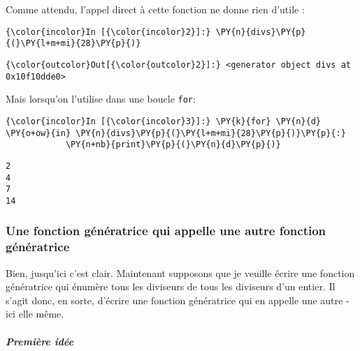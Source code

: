     Comme attendu, l'appel direct à cette fonction ne donne rien d'utile :

    \begin{Verbatim}[commandchars=\\\{\},frame=single,framerule=0.3mm,rulecolor=\color{cellframecolor}]
{\color{incolor}In [{\color{incolor}2}]:} \PY{n}{divs}\PY{p}{(}\PY{l+m+mi}{28}\PY{p}{)}
\end{Verbatim}


\begin{Verbatim}[commandchars=\\\{\},frame=single,framerule=0.3mm,rulecolor=\color{cellframecolor}]
{\color{outcolor}Out[{\color{outcolor}2}]:} <generator object divs at 0x10f10dde0>
\end{Verbatim}
            
    Mais lorsqu'on l'utilise dans une boucle \texttt{for}:

    \begin{Verbatim}[commandchars=\\\{\},frame=single,framerule=0.3mm,rulecolor=\color{cellframecolor}]
{\color{incolor}In [{\color{incolor}3}]:} \PY{k}{for} \PY{n}{d} \PY{o+ow}{in} \PY{n}{divs}\PY{p}{(}\PY{l+m+mi}{28}\PY{p}{)}\PY{p}{:}
            \PY{n+nb}{print}\PY{p}{(}\PY{n}{d}\PY{p}{)}
\end{Verbatim}


    \begin{Verbatim}[commandchars=\\\{\},frame=single,framerule=0.3mm,rulecolor=\color{cellframecolor}]
2
4
7
14
\end{Verbatim}

    \hypertarget{une-fonction-guxe9nuxe9ratrice-qui-appelle-une-autre-fonction-guxe9nuxe9ratrice}{%
\subsubsection{Une fonction génératrice qui appelle une autre fonction
génératrice}\label{une-fonction-guxe9nuxe9ratrice-qui-appelle-une-autre-fonction-guxe9nuxe9ratrice}}

    Bien, jusqu'ici c'est clair. Maintenant supposons que je veuille écrire
une fonction génératrice qui énumère tous les diviseurs de tous les
diviseurs d'un entier. Il s'agit donc, en sorte, d'écrire une fonction
génératrice qui en appelle une autre - ici elle même.

    \hypertarget{premiuxe8re-iduxe9e}{%
\subparagraph{Première idée}\label{premiuxe8re-iduxe9e}}

